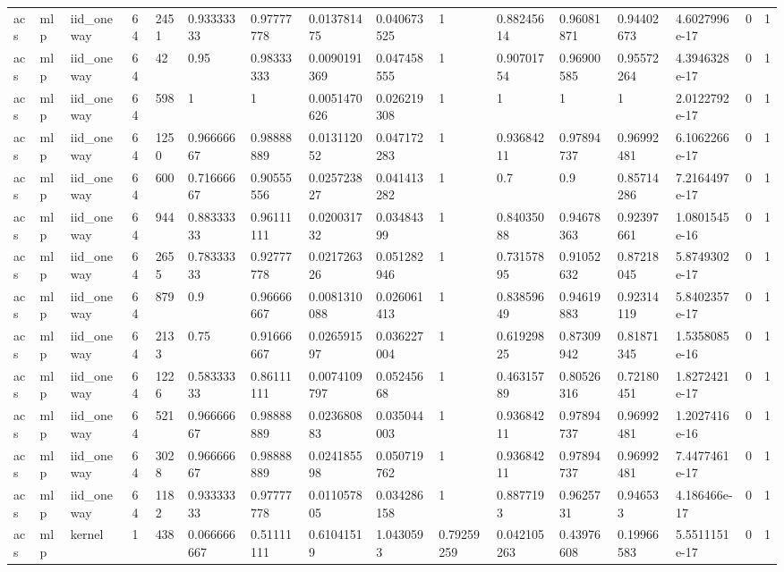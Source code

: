 \begin{tabular}{llllllllllllllll}
acs & mlp & iid\_oneway & 64 & 2451 & 0.93333333 & 0.97777778 & 0.013781475 & 0.040673525 & 1 & 0.88245614 & 0.96081871 & 0.94402673 & 4.6027996e-17 & 0 & 1 \\
acs & mlp & iid\_oneway & 64 & 42 & 0.95 & 0.98333333 & 0.0090191369 & 0.047458555 & 1 & 0.90701754 & 0.96900585 & 0.95572264 & 4.3946328e-17 & 0 & 1 \\
acs & mlp & iid\_oneway & 64 & 598 & 1 & 1 & 0.0051470626 & 0.026219308 & 1 & 1 & 1 & 1 & 2.0122792e-17 & 0 & 1 \\
acs & mlp & iid\_oneway & 64 & 1250 & 0.96666667 & 0.98888889 & 0.013112052 & 0.047172283 & 1 & 0.93684211 & 0.97894737 & 0.96992481 & 6.1062266e-17 & 0 & 1 \\
acs & mlp & iid\_oneway & 64 & 600 & 0.71666667 & 0.90555556 & 0.025723827 & 0.041413282 & 1 & 0.7 & 0.9 & 0.85714286 & 7.2164497e-17 & 0 & 1 \\
acs & mlp & iid\_oneway & 64 & 944 & 0.88333333 & 0.96111111 & 0.020031732 & 0.03484399 & 1 & 0.84035088 & 0.94678363 & 0.92397661 & 1.0801545e-16 & 0 & 1 \\
acs & mlp & iid\_oneway & 64 & 2655 & 0.78333333 & 0.92777778 & 0.021726326 & 0.051282946 & 1 & 0.73157895 & 0.91052632 & 0.87218045 & 5.8749302e-17 & 0 & 1 \\
acs & mlp & iid\_oneway & 64 & 879 & 0.9 & 0.96666667 & 0.0081310088 & 0.026061413 & 1 & 0.83859649 & 0.94619883 & 0.92314119 & 5.8402357e-17 & 0 & 1 \\
acs & mlp & iid\_oneway & 64 & 2133 & 0.75 & 0.91666667 & 0.026591597 & 0.036227004 & 1 & 0.61929825 & 0.87309942 & 0.81871345 & 1.5358085e-16 & 0 & 1 \\
acs & mlp & iid\_oneway & 64 & 1226 & 0.58333333 & 0.86111111 & 0.0074109797 & 0.05245668 & 1 & 0.46315789 & 0.80526316 & 0.72180451 & 1.8272421e-17 & 0 & 1 \\
acs & mlp & iid\_oneway & 64 & 521 & 0.96666667 & 0.98888889 & 0.023680883 & 0.035044003 & 1 & 0.93684211 & 0.97894737 & 0.96992481 & 1.2027416e-16 & 0 & 1 \\
acs & mlp & iid\_oneway & 64 & 3028 & 0.96666667 & 0.98888889 & 0.024185598 & 0.050719762 & 1 & 0.93684211 & 0.97894737 & 0.96992481 & 7.4477461e-17 & 0 & 1 \\
acs & mlp & iid\_oneway & 64 & 1182 & 0.93333333 & 0.97777778 & 0.011057805 & 0.034286158 & 1 & 0.8877193 & 0.9625731 & 0.946533 & 4.186466e-17 & 0 & 1 \\
acs & mlp & kernel & 1 & 438 & 0.066666667 & 0.51111111 & 0.61041519 & 1.0430593 & 0.79259259 & 0.042105263 & 0.43976608 & 0.19966583 & 5.5511151e-17 & 0 & 1 \\

\end{tabular}
